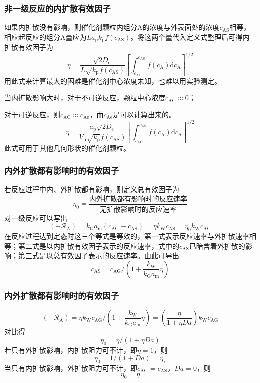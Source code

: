 \begin{frame}
    \frametitle{非一级反应的内扩散有效因子}

    如果内扩散没有影响，则催化剂颗粒内组分A的浓度与外表面处的浓度$c_{\mathrm{AS}}$相等，相应起反应的组分A量应为$La_\mathrm{p}k_\mathrm{p}f(c_{\mathrm{AS}})$。将这两个量代入定义式整理后可得内扩散有效因子为
    \[
        \eta=\frac{\sqrt{2 D_{\mathrm{e}}}}{L \sqrt{k_{\mathrm{p}}} f(c_{\mathrm{AS}})}\left[\int_{c_{\mathrm{AC}}}^{c_{\mathrm{AS}}} f(c_{\mathrm{A}}) \mathrm{d} c_{\mathrm{A}}\right]^{1 / 2}
    \]
    用此式来计算最大的困难是催化剂中心浓度未知，也难以用实验测定。
    
    当内扩散影响大时，对于不可逆反应，颗粒中心浓度$c_{\mathrm{AC}} \approx 0$；
    
    对于可逆反应，则$c_{\mathrm{AC}} \approx  c_{\mathrm{Ae}}$，而$c_{\mathrm{Ae}}$是可以计算出来的。
    \[
        \eta=\frac{a_{\mathrm{p}} \sqrt{2 D_{\mathrm{e}}}}{V_{\mathrm{p}} \sqrt{k_{\mathrm{p}}} f(c_{\mathrm{AS}})}\left[\int_{c_{\mathrm{AC}}}^{c_{\mathrm{AS}}} f(c_{\mathrm{A}}) \mathrm{d} c_{\mathrm{A}}\right]^{1 / 2}
    \]
    此式可用于其他几何形状的催化剂颗粒。

\end{frame}


\begin{frame}
    \frametitle{内外扩散都有影响时的有效因子}

    若反应过程中内、外扩散都有影响，则定义总有效因子为
    \[
        \eta_0 = \frac{\text{内外扩散都有影响时的反应速率}}{\text{无扩散影响时的反应速率}}
    \]
    对一级反应可以写出
    \[
        (-\mathscr{R}_{\mathrm{A}})=k_{\mathrm{G}} a_{\mathrm{m}}(c_{\mathrm{AG}}-c_{\mathrm{AS}})=\eta k_{\mathrm{W}} c_{\mathrm{AS}}=\eta_{0} k_{\mathrm{W}} c_{\mathrm{AG}}
    \]
    在反应过程达到定态时这三个等式是等效的，第一式表示反应速率与外扩散速率相等；第二式是以内扩散有效因子表示的反应速率，式中的$c_{\mathrm{AS}}$已暗含着外扩散的影响；第三式是以总有效因子表示的反应速率。由此可导出
    \[
        c_{\mathrm{AS}}=c_{\mathrm{AG}} /\left(1+\frac{k_{\mathrm{W}}}{k_{\mathrm{G}} a_{\mathrm{m}}} \eta\right) 
    \]

\end{frame}


\begin{frame}
    \frametitle{内外扩散都有影响时的有效因子}

    \[
        (-\mathscr{R}_{\mathrm{A}})=\eta k_{\mathrm{W}} c_{\mathrm{AG}} /\left(1+\frac{k_{\mathrm{W}}}{k_{\mathrm{G}} a_{\mathrm{m}}} \eta\right)=\left(\frac{\eta}{1+\eta D a}\right) k_{\mathrm{W}} c_{\mathrm{AG}}
    \]
    对比得
    \[
        \eta_{0}=\eta /(1+\eta D a)
    \]
    若只有外扩散影响，内扩散阻力可不计，即$\eta = 1$，则
    \[
        \eta_{0}=1 /(1+ D a) = \eta_\mathrm{x}
    \]
    当只有内扩散影响，外扩散阻力可不计，即$c_{\mathrm{AG}} = c_{\mathrm{AS}}$，$Da=0$，则
    \[
        \eta_0 = \eta
    \]

\end{frame}


